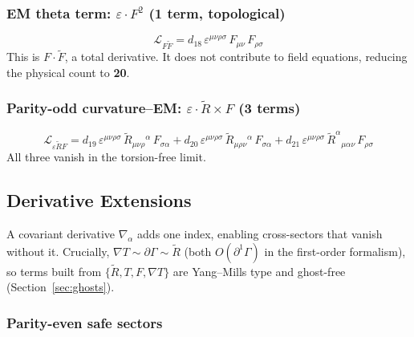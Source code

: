 \documentclass[12pt,a4paper]{article}
\newcommand{\Rt}{\tilde{R}}         %
\newcommand{\del}{\nabla}            %
\newcommand{\pd}{\partial}           %
\newcommand{\eps}{\varepsilon}       %
\begin{document}
\subsubsection{EM theta term: $\eps \cdot F^2$ (1 term, topological)}

\begin{equation}
  \mathcal{L}_{F\tilde{F}}
  = d_{18}\, \eps^{\mu\nu\rho\sigma}\, F_{\mu\nu}\, F_{\rho\sigma}
  \label{eq:ff_dual}
\end{equation}
This is $F \cdot \tilde{F}$, a total derivative. It does not
contribute to field equations, reducing the physical count to
\textbf{20}.

\subsubsection{Parity-odd curvature--EM: $\eps \cdot \Rt \times F$ (3 terms)}

\begin{equation}
\boxed{
  \mathcal{L}_{\eps \Rt F}
  = d_{19}\, \eps^{\mu\nu\rho\sigma}\, \Rt_{\mu\nu\rho}{}^\alpha\, F_{\sigma\alpha}
  + d_{20}\, \eps^{\mu\nu\rho\sigma}\, \Rt_{\mu\rho\nu}{}^\alpha\, F_{\sigma\alpha}
  + d_{21}\, \eps^{\mu\nu\rho\sigma}\, \Rt^\alpha{}_{\mu\alpha\nu}\, F_{\rho\sigma}
}
  \label{eq:eps_curv_em}
\end{equation}
All three vanish in the torsion-free limit.


\subsection{Derivative Extensions}
\label{sec:derivative}

A covariant derivative $\del_\alpha$ adds one index, enabling
cross-sectors that vanish without it. Crucially, $\del T \sim \pd\Gamma
\sim \Rt$ (both $O(\pd^1\Gamma)$ in the first-order formalism), so
terms built from $\{\Rt, T, F, \del T\}$ are Yang--Mills type and
ghost-free (Section~\ref{sec:ghosts}).

\subsubsection{Parity-even safe sectors}
\end{document}
